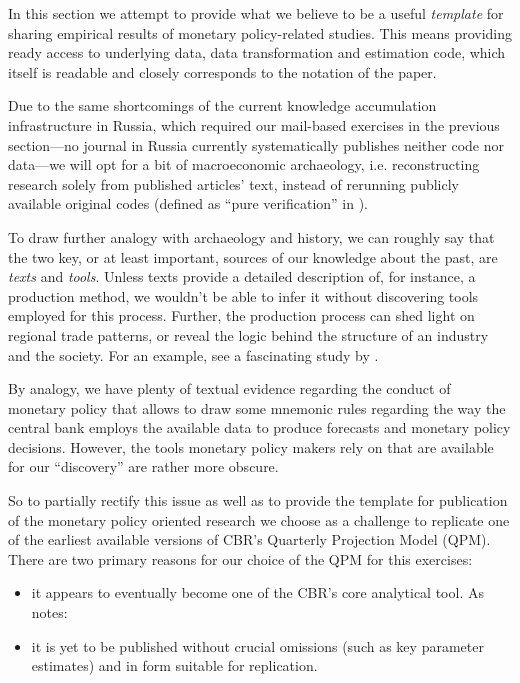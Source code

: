 \documentclass[12pt]{article}
\begin{document}
In this section we attempt to provide what we believe to be a useful {\it template} for sharing empirical results of monetary policy-related studies. This means providing ready access to underlying data, data transformation and estimation code, which itself is readable and closely corresponds to  the notation of the paper. 

Due to the same shortcomings of the current knowledge accumulation infrastructure in Russia, which required our mail-based exercises in the previous section---no journal in Russia currently systematically publishes neither code nor data---we will opt for a bit of macroeconomic archaeology, i.e. reconstructing research solely from published articles' text, instead of rerunning publicly  available original codes (defined as ``pure verification'' in  \cite{hamermesh2007replication}). 

To draw further analogy with archaeology and history, we can roughly say that the two key, or at least important, sources of our knowledge about the past, are {\it texts} and {\it tools}. Unless texts provide a detailed description of, for instance, a production method, we wouldn't be able to infer it without discovering tools employed for this process. Further, the production process can shed light on regional trade patterns, or reveal the logic behind the structure of an industry and the society. For an example, see a fascinating study by \cite{nunn2011potato}.

By analogy, we have plenty of textual evidence regarding the conduct of monetary policy that allows to draw some mnemonic rules regarding the way the central bank employs the available data to produce forecasts and monetary policy decisions. However, the tools monetary policy makers rely on that are available for our ``discovery'' are rather more obscure. 

So to partially rectify this issue as well as to provide the template for publication of the monetary policy oriented research we choose as a challenge to replicate one of the earliest available versions of CBR's Quarterly Projection Model (QPM). There are two primary reasons for our choice of the QPM for this exercises:

\begin{itemize}
    \item it appears to eventually become one of the CBR's core analytical tool. As \cite{bankofrussiampr201501} notes: 
    \item it is yet to be published without crucial omissions (such as key parameter estimates) and in form suitable for replication.
\end{itemize}
\end{document}
